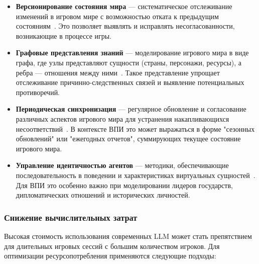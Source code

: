 \begin{itemize}
    \item \textbf{Версионирование состояния мира} — систематическое отслеживание изменений в игровом мире с возможностью отката к предыдущим состояниям~\cite{park2023generative}. Это позволяет выявлять и исправлять несогласованности, возникающие в процессе игры.

    \item \textbf{Графовые представления знаний} — моделирование игрового мира в виде графа, где узлы представляют сущности (страны, персонажи, ресурсы), а ребра — отношения между ними~\cite{ji2023survey}. Такое представление упрощает отслеживание причинно-следственных связей и выявление потенциальных противоречий.

    \item \textbf{Периодическая синхронизация} — регулярное обновление и согласование различных аспектов игрового мира для устранения накапливающихся несоответствий~\cite{zhong2023memgpt}. В контексте ВПИ это может выражаться в форме "сезонных обновлений" или "ежегодных отчетов", суммирующих текущее состояние игрового мира.

    \item \textbf{Управление идентичностью агентов} — методики, обеспечивающие последовательность в поведении и характеристиках виртуальных сущностей~\cite{wang2023rolellm}. Для ВПИ это особенно важно при моделировании лидеров государств, дипломатических отношений и исторических личностей.
\end{itemize}

\subsubsection{Снижение вычислительных затрат}

Высокая стоимость использования современных LLM может стать препятствием для длительных игровых сессий с большим количеством игроков. Для оптимизации ресурсопотребления применяются следующие подходы:

